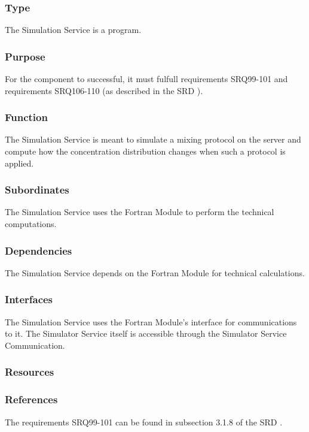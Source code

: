 \subsubsection*{Type}
The Simulation Service is a program.

\subsubsection*{Purpose}
For the component to successful, it must fulfull requirements SRQ99-101 and requirements SRQ106-110 (as described in the SRD \cite{srd}).

\subsubsection*{Function}
The Simulation Service is meant to simulate a mixing protocol on the server and compute how the concentration distribution changes when such a protocol is applied.

\subsubsection*{Subordinates}
The Simulation Service uses the Fortran Module to perform the technical computations.

\subsubsection*{Dependencies}
The Simulation Service depends on the Fortran Module for technical calculations.

\subsubsection*{Interfaces}
The Simulation Service uses the Fortran Module's interface for communications to it. The Simulator Service itself is accessible through the Simulator Service Communication.

\subsubsection*{Resources}

\subsubsection*{References}
The requirements SRQ99-101 can be found in subsection 3.1.8 of the SRD \cite{srd}.

